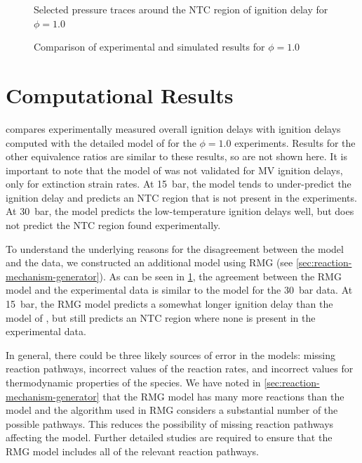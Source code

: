 \documentclass[12pt]{../ussci}
\begin{document}
\begin{figure}[htb]
    \begin{minipage}[t]{0.48\textwidth}
        \centering
        \resizebox{\linewidth}{!}{}
        \caption{Selected pressure traces around the NTC region of ignition delay for $\phi=1.0$}
        \label{fig:pressure-traces}
    \end{minipage}\hfill%
    \begin{minipage}[t]{0.48\textwidth}
        \centering
        \resizebox{\linewidth}{!}{}
        \caption{Comparison of experimental and simulated results for $\phi=1.0$}
        \label{fig:simulation-comparison}
    \end{minipage}
\end{figure}

\section{Computational Results}\label{sec:computational-results}

 compares experimentally measured overall
ignition delays with ignition delays computed with the detailed model of
\textcite{Dievart2013} for the $\phi=1.0$ experiments. Results for the other
equivalence ratios are similar to these results, so are not shown here. It is
important to note that the model of \textcite{Dievart2013} was not validated for
MV ignition delays, only for extinction strain rates. At \SI{15}{\bar}, the
model tends to under-predict the ignition delay and predicts an NTC region that
is not present in the experiments. At \SI{30}{\bar}, the model predicts the
low-temperature ignition delays well, but does not predict the NTC region found
experimentally.

To understand the underlying reasons for the disagreement between the
\textcite{Dievart2013} model and the data, we constructed an additional model
using RMG (see \cref{sec:reaction-mechanism-generator}). As can be seen in
\cref{fig:simulation-comparison}, the agreement between the RMG model and the
experimental data is similar to the \textcite{Dievart2013} model for the
\SI{30}{\bar} data. At \SI{15}{\bar}, the RMG model predicts a somewhat longer
ignition delay than the model of \textcite{Dievart2013}, but still predicts an
NTC region where none is present in the experimental data.

In general, there could be three likely sources of error in the models: missing
reaction pathways, incorrect values of the reaction rates, and incorrect values
for thermodynamic properties of the species. We have noted in
\cref{sec:reaction-mechanism-generator} that the RMG model has many more
reactions than the \textcite{Dievart2013} model and the algorithm used in RMG
considers a substantial number of the possible pathways. This reduces the
possibility of missing reaction pathways affecting the model. Further detailed
studies are required to ensure that the RMG model includes all of the relevant
reaction pathways.
\end{document}
